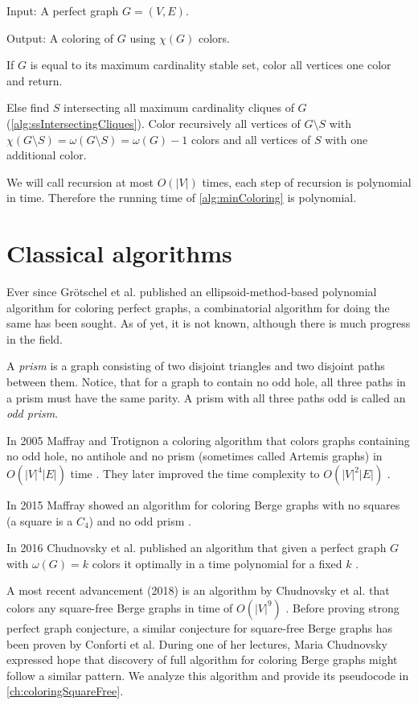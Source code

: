 \begin{alg}
  \label{alg:minColoring}
  Input: A perfect graph $G = (V, E)$.

  \noindent Output: A coloring of $G$ using $\chi(G)$ colors.
\end{alg}
\begin{algtext2}
  If $G$ is equal to its maximum cardinality stable set, color all vertices one color and return.

  Else find $S$ intersecting all maximum cardinality cliques of $G$ (\cref{alg:ssIntersectingCliques}). Color recursively all vertices of $G \setminus S$ with $\chi(G \setminus S) = \omega(G \setminus S) = \omega(G) -1$ colors and all vertices of $S$ with one additional color.
\end{algtext2}

We will call recursion at most $O(|V|)$ times, each step of recursion is polynomial in time. Therefore the running time of \cref{alg:minColoring} is polynomial.

\section{Classical algorithms}
\label{sec:classicalColoring}

Ever since Grötschel et al. published an ellipsoid-method-based polynomial algorithm for coloring perfect graphs, a combinatorial algorithm for doing the same has been sought. As of yet, it is not known, although there is much progress in the field.

A \emph{prism} is a graph consisting of two disjoint triangles and two disjoint paths between them. Notice, that for a graph to contain no odd hole, all three paths in a prism must have the same parity. A prism with all three paths odd is called an \emph{odd prism}.

In 2005 Maffray and Trotignon a coloring algorithm that colors graphs containing no odd hole, no antihole and no prism (sometimes called Artemis graphs) in $O(|V|^4|E|)$ time \cite{Maffray2006}. They later improved the time complexity to $O(|V|^2|E|)$ \cite{Lvque2009}.

In 2015 Maffray showed an algorithm for coloring Berge graphs with no squares (a square is a $C_4$) and no odd prism \cite{Maff2015}.

In 2016 Chudnovsky et al. published an algorithm that given a perfect graph $G$ with $\omega(G) = k$ colors it optimally in a time polynomial for a fixed $k$ \cite{Chudnovsky2017}.

A most recent advancement (2018) is an algorithm by Chudnovsky et al. that colors any square-free Berge graphs in time of $O(|V|^9)$ \cite{Chudnovsky2019}. Before proving strong perfect graph conjecture, a similar conjecture for square-free Berge graphs has been proven by Conforti et al. \cite{Conforti2004} During one of her lectures, Maria Chudnovsky expressed hope that discovery of full algorithm for coloring Berge graphs might follow a similar pattern. We analyze this algorithm and provide its pseudocode in \cref{ch:coloringSquareFree}.